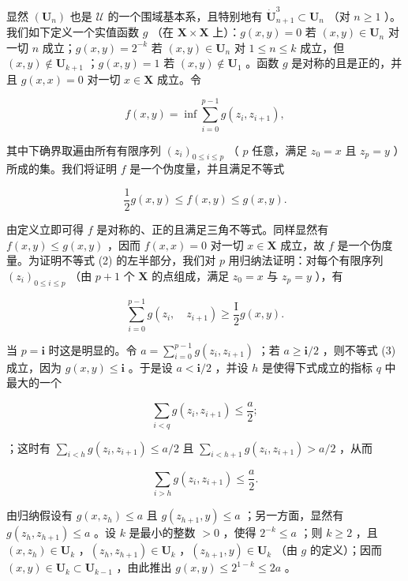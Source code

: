 显然 \((\mathbf{U}_n)\) 也是 \(\mathcal{U}\) 的一个围域基本系，且特别地有 \(\dot{\mathbf{U}}_{n+1}^3 \subset \mathbf{U}_n\) （对 \(n \geqslant 1\) ）。我们如下定义一个实值函数 \(g\) （在 \(\mathbf{X} \times \mathbf{X}\) 上）：\(g(x, y) = 0\) 若 \((x, y) \in \mathbf{U}_n\) 对一切 \(n\) 成立；\(g(x, y) = 2^{-k}\) 若 \((x, y) \in \mathbf{U}_n\) 对 \(1 \leqslant n \leqslant k\) 成立，但 \((x, y) \notin \mathbf{U}_{k+1}\) ；\(g(x, y) = 1\) 若 \((x, y) \notin \mathbf{U}_1\) 。函数 \(g\) 是对称的且是正的，并且 \(g(x, x) = 0\) 对一切 \(x \in \mathbf{X}\) 成立。令

\[
f (x, y) = \inf \sum_ {i = 0} ^ {p - 1} g \left(z _ {i}, z _ {i + 1}\right),
\]

其中下确界取遍由所有有限序列 \((z_{i})_{0\leqslant i\leqslant p}\) （ \(p\) 任意，满足 \(z_0 = x\) 且 \(z_{p} = y\) ）所成的集。我们将证明 \(f\) 是一个伪度量，并且满足不等式

\[
\frac {1}{2} g (x, y) \leqslant f (x, y) \leqslant g (x, y).\tag{2}
\]

由定义立即可得 \(f\) 是对称的、正的且满足三角不等式。同样显然有 \(f(x, y) \leqslant g(x, y)\) ，因而 \(f(x, x) = 0\) 对一切 \(x \in \mathbf{X}\) 成立，故 \(f\) 是一个伪度量。为证明不等式 (2) 的左半部分，我们对 \(p\) 用归纳法证明：对每个有限序列 \((z_i)_{0 \leqslant i \leqslant p}\) （由 \(p + 1\) 个 \(\mathbf{X}\) 的点组成，满足 \(z_0 = x\) 与 \(z_p = y\) ），有

\[
\sum_ {i = 0} ^ {p - 1} g (z _ {i}, \quad z _ {i + 1}) \geqslant \frac {\mathrm{I}}{2} g (x, y).\tag{3}
\]

当 \(p = \mathbf{i}\) 时这是明显的。令 \(a = \sum_{i=0}^{p-1} g(z_i, z_{i+1})\) ；若 \(a \geqslant \mathbf{i}/2\) ，则不等式 (3) 成立，因为 \(g(x, y) \leqslant \mathbf{i}\) 。于是设 \(a < \mathbf{i}/2\) ，并设 \(h\) 是使得下式成立的指标 \(q\) 中最大的一个

\[
\sum_ {i <   q} g (z _ {i}, z _ {i + 1}) \leqslant \frac {a}{2};
\]

；这时有 \(\sum_{i < h} g(z_i, z_{i+1}) \leqslant a/2\) 且 \(\sum_{i < h+1} g(z_i, z_{i+1}) > a/2\) ，从而

\[
\sum_ {i > h} g (z _ {i}, z _ {i + 1}) \leqslant \frac {a}{2}.
\]

由归纳假设有 \(g(x, z_h) \leqslant a\) 且 \(g(z_{h+1}, y) \leqslant a\) ；另一方面，显然有 \(g(z_h, z_{h+1}) \leqslant a\) 。设 \(k\) 是最小的整数 \(> 0\) ，使得 \(2^{-k} \leqslant a\) ；则 \(k \geqslant 2\) ，且 \((x, z_h) \in \mathbf{U}_k\) ，\((z_h, z_{h+1}) \in \mathbf{U}_k\) ，\((z_{h+1}, y) \in \mathbf{U}_k\) （由 \(g\) 的定义）；因而 \((x, y) \in \mathbf{U}_k \subset \mathbf{U}_{k-1}\) ，由此推出 \(g(x, y) \leqslant 2^{1-k} \leqslant 2a\) 。

